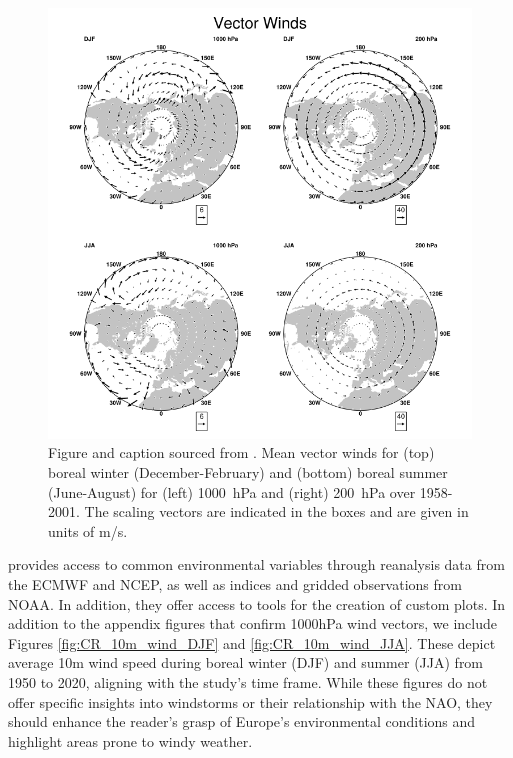         \begin{figure}
            \centering
            \includegraphics[width=\textwidth]{figures/vectorwinds.png}
            \caption{Figure and caption sourced from \cite{Hurrell2003}. Mean vector winds for (top) boreal winter (December-February) and (bottom) boreal summer (June-August) for (left) 1000~hPa and (right) 200~hPa over 1958-2001. The scaling vectors are indicated in the boxes and are given in units of m/s.}
            \label{fig:vectorwinds}
        \end{figure}
    
        \cite{ClimateReanalyzer2023} provides access to common environmental variables through reanalysis data from the ECMWF and NCEP, as well as indices and gridded observations from NOAA. In addition, they offer access to tools for the creation of custom plots. In addition to the appendix figures that confirm 1000hPa wind vectors, we include Figures \ref{fig:CR_10m_wind_DJF} and \ref{fig:CR_10m_wind_JJA}. These depict average 10m wind speed during boreal winter (DJF) and summer (JJA) from 1950 to 2020, aligning with the study's time frame. While these figures do not offer specific insights into windstorms or their relationship with the NAO, they should enhance the reader's grasp of Europe's environmental conditions and highlight areas prone to windy weather.
        
